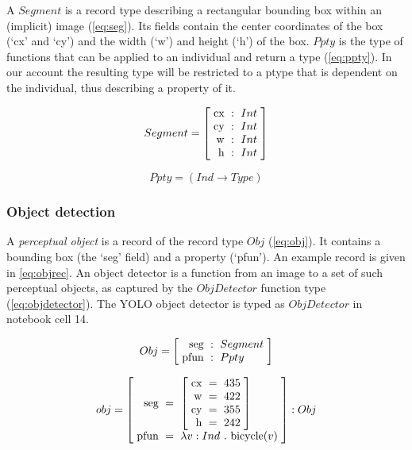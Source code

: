A $Segment$ is a record type describing a rectangular bounding box within an (implicit) image (\autoref{eq:seg}).
Its fields contain the center coordinates of the box (`cx' and `cy') and the width (`w') and height (`h') of the box.
$Ppty$ is the type of functions that can be applied to an individual and return a type (\autoref{eq:ppty}).
In our account the resulting type will be restricted to a ptype that is dependent on the individual, thus describing a property of it.

\begin{equation}\label{eq:seg}
Segment = \rec{
\text{cx} &:& Int\\
\text{cy} &:& Int\\
\text{w} &:& Int\\
\text{h} &:& Int
}\end{equation}

\begin{equation}\label{eq:ppty}
Ppty = (Ind \rightarrow Type)\end{equation}




\subsubsection{Object detection}

A \textit{perceptual object} is a record of the record type $Obj$ (\autoref{eq:obj}).
It contains a bounding box (the `seg' field) and a property (`pfun').
An example record is given in \autoref{eq:objrec}.
An object detector is a function from an image to a set of such perceptual objects, as captured by the $ObjDetector$ function type (\autoref{eq:objdetector}).
The YOLO object detector is typed as $ObjDetector$ in notebook cell 14.


\begin{equation}\label{eq:obj}
Obj = \rec{
\text{seg} &:& Segment\\
\text{pfun} &:& Ppty \\
}\end{equation}

\begin{equation}\label{eq:objrec}
obj =
\rec{
\text{seg} &=& \rec{
\text{cx} &=& 435\\
\text{w} &=& 422\\
\text{cy} &=& 355\\
\text{h} &=& 242
}\\
\text{pfun} &=& \lambda v:Ind\ .\ \text{bicycle}(v)\\
} : Obj\end{equation}


